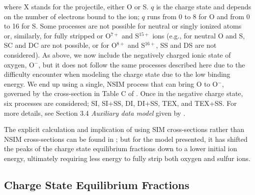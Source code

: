 \documentclass[draft]{agujournal2018}
\begin{document}
where X stands for the projectile, either O or S. $q$ is the charge state and depends on the number of electrons bound to the ion; $q$ runs from 0 to 8 for O and from 0 to 16 for S.
Some processes are not possible for neutral or singly ionized atoms or, similarly, for fully stripped or O$^{7+}$ and S$^{15+}$ ions (e.g., for neutral O and S, SC and DC are not possible, or for O$^{8+}$ and S$^{16+}$, SS and DS are not considered).
As above, we now include the negatively charged ionic state of oxygen, O$^-$, but it does not follow the same processes described here due to the difficulty \citet{schultz2018} encounter when modeling the charge state due to the low binding energy.
We end up using a single, NSIM process that can bring O to O$^-$, governed by the cross-section in Table C of \citet{schultz2018}.
Once in the negative charge state, six processes are considered; SI, SI+SS, DI, DI+SS, TEX, and TEX+SS.
For more details, see Section 3.4 \textit{Auxiliary data model} given by \citet{schultz2018}.

The explicit calculation and implication of using SIM cross-sections rather than NSIM cross-sections can be found in \citet{schultz2018}; but for the model presented, it has shifted the peaks of the charge state equilibrium fractions down to a lower initial ion energy, ultimately requiring less energy to fully strip both oxygen and sulfur ions.

\subsection{Charge State Equilibrium Fractions}
\end{document}
